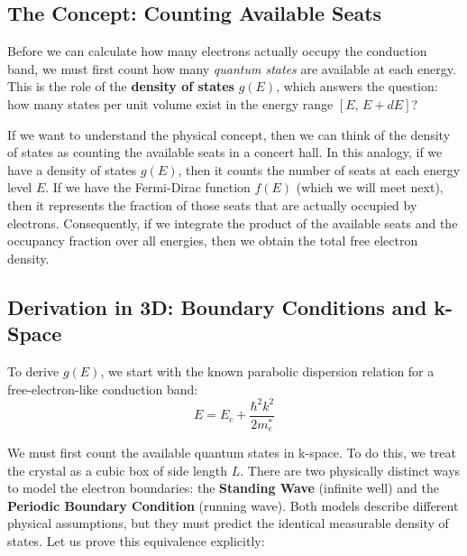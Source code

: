 \subsection{The Concept: Counting Available Seats}

Before we can calculate how many electrons actually occupy the conduction band, we must first count how many \emph{quantum states} are available at each energy. This is the role of the \textbf{density of states} $g(E)$, which answers the question: how many states per unit volume exist in the energy range $[E,\, E+dE]$?

If we want to understand the physical concept, then we can think of the density of states as counting the available seats in a concert hall. In this analogy, if we have a density of states $g(E)$, then it counts the number of seats at each energy level $E$. If we have the Fermi-Dirac function $f(E)$ (which we will meet next), then it represents the fraction of those seats that are actually occupied by electrons. Consequently, if we integrate the product of the available seats and the occupancy fraction over all energies, then we obtain the total free electron density.

\subsection{Derivation in 3D: Boundary Conditions and k-Space}

To derive $g(E)$, we start with the known parabolic dispersion relation for a free-electron-like conduction band:
\begin{equation*}
    E = E_c + \frac{\hbar^2 k^2}{2 m^*_e}
\end{equation*}

We must first count the available quantum states in k-space. To do this, we treat the crystal as a cubic box of side length $L$. There are two physically distinct ways to model the electron boundaries: the \textbf{Standing Wave} (infinite well) and the \textbf{Periodic Boundary Condition} (running wave). Both models describe different physical assumptions, but they must predict the identical measurable density of states. Let us prove this equivalence explicitly:

